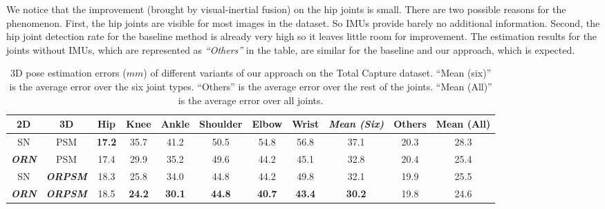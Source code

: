 \documentclass[10pt,twocolumn,letterpaper]{article}
\begin{document}
We notice that the improvement (brought by visual-inertial fusion) on the hip joints is small. There are two possible reasons for the phenomenon. First, the hip joints are visible for most images in the dataset. So IMUs provide barely no additional information. Second, the hip joint detection rate for the baseline method is already very high so it leaves little room for improvement. The estimation results for the joints without IMUs, which are represented as \emph{``Others''} in the table, are similar for the baseline and our approach, which is expected.


\begin{table*}[]
\center
\caption{$3$D pose estimation errors ($mm$) of different variants of our approach on the Total Capture dataset. ``Mean (six)'' is the average error over the six joint types. ``Others'' is the average error over the rest of the joints. ``Mean (All)'' is the average error over all joints.}
\label{table:ablation}
\begin{tabular}{cc||ccccccc||c||c}
\toprule
2D & 3D  & Hip  & Knee & Ankle & Shoulder & Elbow & Wrist & \emph{Mean (Six)} & Others & Mean (All) \\ \hline
SN      & PSM             & \textbf{17.2} & 35.7 & 41.2 & 50.5 & 54.8 & 56.8 & 37.1 & 20.3 & 28.3\\
\textbf{\emph{ORN}}  & PSM             & 17.4 & 29.9 & 35.2 & 49.6 & 44.2 & 45.1 & 32.8 & 20.4 & 25.4 \\
SN      & \textbf{\emph{ORPSM}}        & 18.3 & 25.8 & 34.0 & 44.8 & 44.2 & 49.8 & 32.1 & 19.9 & 25.5\\
\textbf{\emph{ORN}}  & \textbf{\emph{ORPSM}}        & 18.5 & \textbf{24.2} & \textbf{30.1} & \textbf{44.8} & \textbf{40.7} & \textbf{43.4} & \textbf{30.2} & {19.8} & {24.6} \\
\toprule
\end{tabular}
\end{table*}
\end{document}
